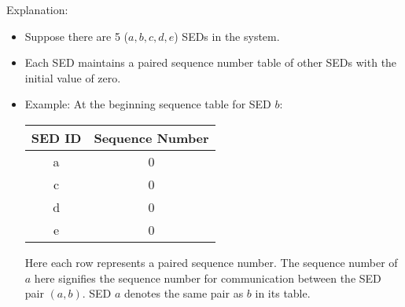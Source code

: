 \documentclass[11pt,oneside,onecolumn,letterpaper]{article}
\begin{document}
Explanation:
  \begin{itemize}
  \item Suppose there are 5 ($a, b, c, d, e$) SEDs in the system.
  \item Each SED maintains a paired sequence number table of other SEDs with the initial value of zero.
  \item  Example: At the beginning sequence table for SED $b$:

    \begin{center}
  \begin{tabular}{ |c|c| } 
   \hline
  \textbf{SED ID} & \textbf{Sequence Number} \\
 	\hline \hline
 	a & 0 \\ 
	c & 0  \\ 
 	d & 0 \\ 
 	e & 0 \\ 
	 \hline
\end{tabular}
\end{center}
Here each row represents a paired sequence number.
The sequence number of $a$ here signifies the sequence number for communication between the SED pair $(a,b)$. SED $a$ denotes the same pair as $b$ in its table.


\end{itemize}
\end{document}
